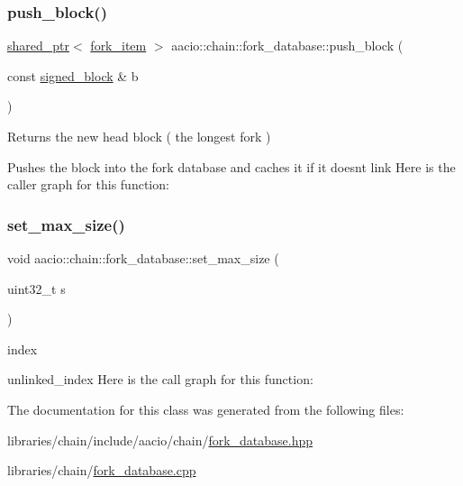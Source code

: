 \subsubsection{\texorpdfstring{push\+\_\+block()}{push\_block()}}
{\footnotesize\ttfamily \mbox{\hyperlink{classfc_1_1shared__ptr}{shared\+\_\+ptr}}$<$ \mbox{\hyperlink{structaacio_1_1chain_1_1fork__item}{fork\+\_\+item}} $>$ aacio\+::chain\+::fork\+\_\+database\+::push\+\_\+block (\begin{DoxyParamCaption}\item[{const \mbox{\hyperlink{structaacio_1_1chain_1_1signed__block}{signed\+\_\+block}} \&}]{b }\end{DoxyParamCaption})}

\begin{DoxyReturn}{Returns}
the new head block ( the longest fork )
\end{DoxyReturn}
Pushes the block into the fork database and caches it if it doesn\textquotesingle{}t link Here is the caller graph for this function\+:
\mbox{\label{classaacio_1_1chain_1_1fork__database_af7877508fbed8bde99d84a582993494c}} 
\subsubsection{\texorpdfstring{set\+\_\+max\+\_\+size()}{set\_max\_size()}}
{\footnotesize\ttfamily void aacio\+::chain\+::fork\+\_\+database\+::set\+\_\+max\+\_\+size (\begin{DoxyParamCaption}\item[{uint32\+\_\+t}]{s }\end{DoxyParamCaption})}

index

unlinked\+\_\+index Here is the call graph for this function\+:


The documentation for this class was generated from the following files\+:\begin{DoxyCompactItemize}
\item 
libraries/chain/include/aacio/chain/\mbox{\hyperlink{fork__database_8hpp}{fork\+\_\+database.\+hpp}}\item 
libraries/chain/\mbox{\hyperlink{fork__database_8cpp}{fork\+\_\+database.\+cpp}}\end{DoxyCompactItemize}
